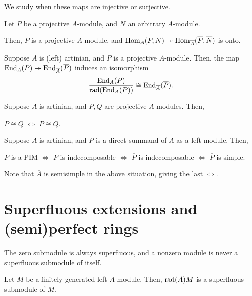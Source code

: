 \documentclass[12pt]{article}
\begin{document}
We study when these maps are injective or surjective.

\begin{thm}
	Let $P$ be a projective $A$-module, and $N$ an arbitrary $A$-module.

	Then, $\overline{P}$ is a projective $\overline{A}$-module, 
	and $\operatorname{Hom}_{A}(P, N) \twoheadrightarrow \operatorname{Hom}_{\overline{A}}(\overline{P}, \overline{N})$ is onto.
\end{thm}

\begin{thm}
	Suppose $A$ is (left) artinian, and $P$ is a projective $A$-module. Then, the map $\operatorname{End}_{A}(P) \twoheadrightarrow \operatorname{End}_{\overline{A}}(\overline{P})$ induces an isomorphism
	\begin{equation*} 
		\frac{\operatorname{End}_{A}(P)}{\operatorname{rad}(\operatorname{End}_{A}(P))} \cong \operatorname{End}_{\overline{A}}(\overline{P}).
	\end{equation*}
\end{thm}
\begin{cor} \label{cor:artinian-projective-isomorphic-mod-radical}
	Suppose $A$ is artinian, and $P, Q$ are projective $A$-modules. Then,
	\begin{center}
		$P \cong Q$ $\Leftrightarrow$ $\overline{P} \cong \overline{Q}$.
	\end{center}
\end{cor}

\begin{thm} \label{thm:artinian-PIM-criteria}
	Suppose $A$ is artinian, and $P$ is a direct summand of $A$ as a left module. Then,
	\begin{center}
		$P$ is a PIM $\Leftrightarrow$ $P$ is indecomposable $\Leftrightarrow$ $\overline{P}$ is indecomposable $\Leftrightarrow$ $\overline{P}$ is simple.
	\end{center}
\end{thm}
Note that $\overline{A}$ is semisimple in the above situation, giving the last $\Leftrightarrow$. 

\section{Superfluous extensions and (semi)perfect rings}

\begin{thm}
	The zero submodule is always superfluous, and a nonzero module is never a superfluous submodule of itself. 
\end{thm}

\begin{thm}
	Let $M$ be a finitely generated left $A$-module. 
	Then, $\operatorname{rad}(A)M$ is a superfluous submodule of $M$.
\end{thm}
\end{document}
